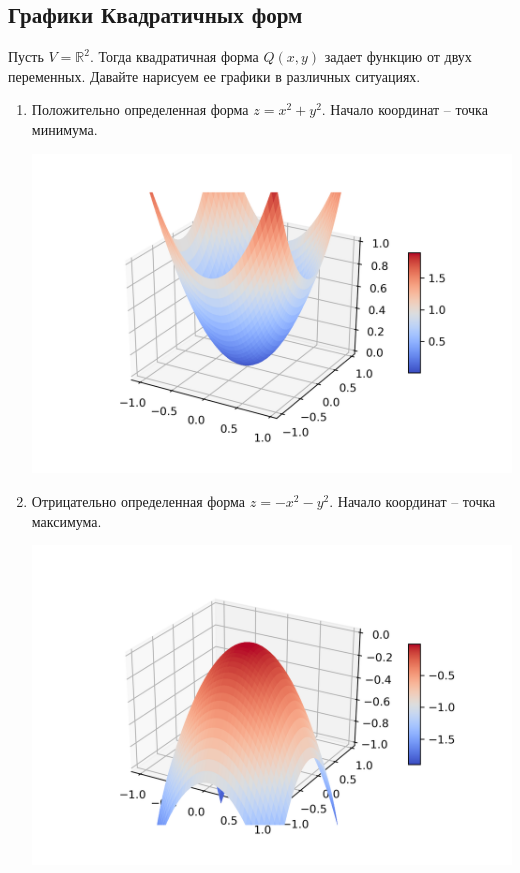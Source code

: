 \subsection{Графики Квадратичных форм}

Пусть $V = \mathbb R^2$.
Тогда квадратичная форма $Q(x, y)$ задает функцию от двух переменных.
Давайте нарисуем ее графики в различных ситуациях.

\begin{enumerate}
\item Положительно определенная форма $z = x^2 + y^2$.
Начало координат -- точка минимума.

\includegraphics[scale = 0.5]{Figures/graph_positive.png}

\item Отрицательно определенная форма $z = - x^2 - y^2$.
Начало координат -- точка максимума.

\includegraphics[scale = 0.5]{Figures/graph_negative.png}


\end{enumerate}
